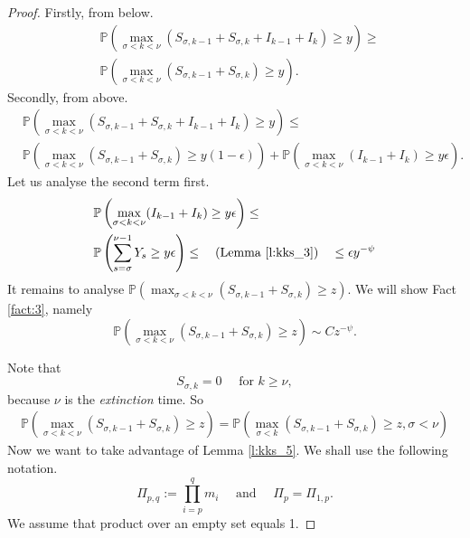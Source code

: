 \documentclass[12pt]{article}
\newcommand{\Pro}{\mathbb{P}}
\newcommand*\Proo[1]{\Pro \left( #1 \right) }
\begin{document}
\begin{proof}
Firstly, from below.
\begin{equation}\label{eq:l1_below}
\begin{aligned}
    &\Proo{\max_{\sigma < k < \nu} (S_{\sigma, k-1} + S_{\sigma, k} + I_{k-1} + I_k) \geq y } \geq \\
    &\Proo{\max_{\sigma < k < \nu} (S_{\sigma, k-1} + S_{\sigma, k}) \geq y }.
\end{aligned}
\end{equation}
Secondly, from above.
\begin{equation} \label{eq:l1_above}
\begin{aligned}
    &\Proo{\max_{\sigma < k < \nu} (S_{\sigma, k-1} + S_{\sigma, k} + I_{k-1} + I_k) \geq y } \leq \\
    &\Proo{\max_{\sigma < k < \nu} (S_{\sigma, k-1} + S_{\sigma, k}) \geq y(1-\epsilon) } + \Proo{\max_{\sigma < k < \nu} (I_{k-1} + I_{k}) \geq y \epsilon }.
\end{aligned}
\end{equation}
Let us analyse the second term first. 
\begin{equation*}
\begin{aligned}
    &\Proo{\max_{\sigma < k < \nu} (I_{k-1} + I_{k}) \geq y \epsilon } \leq \\
    &\Proo{\sum_{s=\sigma}^{\nu-1}Y_s \geq y \epsilon} \leq \quad \text{(Lemma \ref{l:kks_3})} \quad \leq \epsilon y^{-\psi}
\end{aligned}
\end{equation*}
It remains to analyse $\Proo{\max_{\sigma < k < \nu} (S_{\sigma, k-1} + S_{\sigma, k}) \geq z }.$ We will show Fact \ref{fact:3}, namely
\begin{equation*}
    \Proo{\max_{\sigma < k < \nu} (S_{\sigma, k-1} + S_{\sigma, k}) \geq z } \sim Cz^{-\psi}.
\end{equation*}

\bigskip

Note that 
\begin{equation*}
    S_{\sigma, k} = 0 \quad \text{ for } k \geq \nu,
\end{equation*}
because $\nu$ is the \textit{extinction} time. So
\begin{equation}\label{eq:l1_e2}
\begin{aligned}
    \Proo{\max_{\sigma < k< \nu} (S_{\sigma, k-1} + S_{\sigma, k}) \geq z }   = \Proo{\max_{\sigma < k} (S_{\sigma, k-1} + S_{\sigma, k}) \geq z, \sigma < \nu }
\end{aligned}
\end{equation}
Now we want to take advantage of Lemma \ref{l:kks_5}. We shall use the following notation.
\begin{equation*}
\Pi_{p,q} := \prod_{i=p}^{q} m_i \quad \text{ and } \quad  \Pi_{p} = \Pi_{1,p}.
\end{equation*}
We assume that product over an empty set equals 1.


\end{proof}
\end{document}
